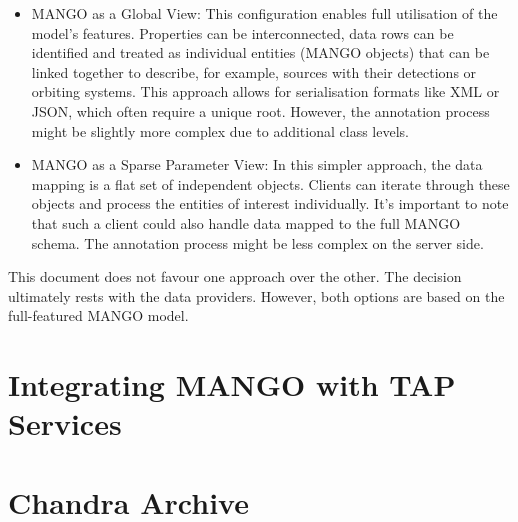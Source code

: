 \documentclass[11pt,a4paper]{ivoa}
\begin{document}
\begin{itemize}[noitemsep,topsep=0pt,parsep=0pt,partopsep=0pt]
    \item MANGO as a Global View: This configuration enables full utilisation of the 
          model's features. Properties can be interconnected, data rows can be identified
          and treated as individual entities (MANGO objects) that can be linked together to describe,
          for example, sources with their detections or orbiting systems.
          This approach allows for serialisation formats like XML or JSON, which often require
          a unique root.
          However, the annotation process might be slightly more complex due to additional class levels.
    \item MANGO as a Sparse Parameter View: In this simpler approach, the data mapping is a
          flat set of independent objects. Clients can iterate through these objects and process
          the entities of interest individually.
          It's important to note that such a client could also handle data mapped to the full MANGO schema.
          The annotation process might be less complex on the server side.
\end{itemize}

This document does not favour one approach over the other.
The decision ultimately rests with the data providers.
However, both options are based on the full-featured MANGO model.

%



\section{Integrating MANGO with TAP Services}


\pagebreak
\appendix

% 

% 

\section{Chandra Archive}
\label{sec:chandra} 

\end{document}
